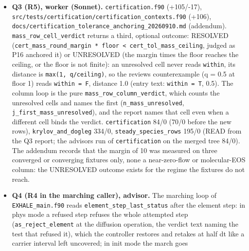 \documentclass[english,a4paper]{my_memo}
\begin{document}
\begin{itemize}
  against 54.2 s, inside the noise. \texttt{mol\_diffusion} and \texttt{lower\_profile} at 300
  steps: data rows identical to the control build. \texttt{atomic\_elem\_newton}: pass
  1 identical; at pass 2 the judged rows are identical and omega differs
  (0.500 control, 0.250 Q2), attributable to the floor change turning a
  floor-level residual from unsolved to solved (READ from the Q2 report; the
  advisor\textquotesingle s own three-pass run of the merged tree, above, has omega 0.250 at
  pass 2 on both builds because the control binary of that run already
  carried Q2).
\item
  \textbf{Q3 (R5), worker (Sonnet).} \texttt{certification.f90} (+105/-17),
  \texttt{src/tests/certification/certification\_contexts.f90} (+106),
  \texttt{docs/certification\_tolerance\_anchoring\_20260910.md} (addendum).
  \texttt{mass\_row\_cell\_verdict} returns a third, optional outcome: RESOLVED
  (\texttt{cert\_mass\_round\_margin\ *\ floor\ \textless{}\ cert\_tol\_mass\_ceiling}, judged as P16
  anchored it) or UNRESOLVED (the margin times the floor reaches the ceiling,
  or the floor is not finite): an unresolved cell never reads \texttt{within}, its
  distance is \texttt{max(1,\ q/ceiling)}, so the review\textquotesingle s counterexample (q = 0.5 at
  floor 1) reads \texttt{within\ =\ F}, distance 1.0 (entry text: \texttt{within\ =\ T}, 0.5).
  The column loop is the pure \texttt{mass\_row\_column\_verdict}, which counts the
  unresolved cells and names the first (\texttt{n\_mass\_unresolved},
  \texttt{j\_first\_mass\_unresolved}), and the report names that cell even when a
  different cell binds the verdict. \texttt{certification} 84/0 (70/0 before the
  new rows), \texttt{krylov\_and\_dogleg} 334/0, \texttt{steady\_species\_rows} 195/0 (READ
  from the Q3 report; the advisor\textquotesingle s run of \texttt{certification} on the merged tree
  84/0). The addendum records that the margin of 10 was measured on three
  converged or converging fixtures only, none a near-zero-flow or
  molecular-EOS column: the UNRESOLVED outcome exists for the regime the
  fixtures do not reach.
\item
  \textbf{Q4 (R4 in the marching caller), advisor.} The marching loop of
  \texttt{EXHALE\_main.f90} reads \texttt{element\_step\_last\_status} after the element step:
  in phys mode a refused step refuses the whole attempted step
  (\texttt{as\_reject\_element} at the diffusion operation, the verdict text naming
  the test that refused it), which the controller restores and retakes at
  half dt like a carrier interval left uncovered; in init mode the march goes

\end{itemize}
\end{document}
